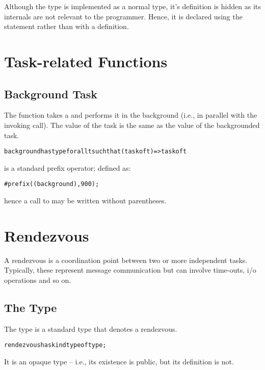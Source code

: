 \begin{aside}
Although the  type is implemented as a normal type, it's definition is hidden as its internals are not relevant to the programmer. Hence, it is declared using the  statement rather than with a  definition.
\end{aside}

\section{Task-related Functions}
\label{taskFunctions}

\subsection{Background Task}
\label{backgroundTask}
The  function takes a  and performs it in the background (i.e., in parallel with the invoking call). The value of the  task is the same as the value of the backgrounded task.
\begin{alltt}
background has type for all t such that (task of t)=>task of t
\end{alltt}
\begin{aside}
 is a standard prefix operator; defined as:
\begin{alltt}
\#prefix((background),900);
\end{alltt}
hence a call to  may be written without parentheses.
\end{aside}

\section{Rendezvous}
\label{rendezvous}

A rendezvous is a coordination point between two or more independent tasks. Typically, these represent message communication but can involve time-outs, i/o operations and so on.

\subsection{The  Type}
\label{rendezvousType}
The  type is a standard type that denotes a rendezvous. 
\begin{alltt}
rendezvous has kind type of type;
\end{alltt}
\begin{aside}
It is an opaque type -- i.e., its existence is public, but its definition is not.
\end{aside}

